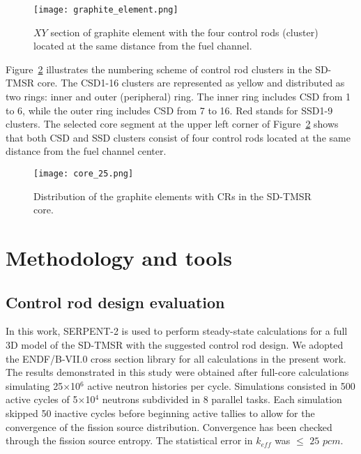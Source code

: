 \begin{figure}[t!]  %
	\centering
	\hspace{+0.65in}
	\texttt{[image: graphite\_element.png]}
	\caption{$XY$ section of graphite element with the four control rods 
	(cluster) located at the same distance from the fuel channel.}
	\label{fig:graphite_elemen}
\end{figure}

Figure~\ref{fig:core_25} illustrates the numbering scheme of control rod 
clusters in the SD-TMSR core.
The CSD1-16 clusters are represented as yellow and distributed as two rings: inner and outer (peripheral) ring. The inner ring includes CSD from 1 to 6, while the outer ring includes CSD from 7 to 16. Red stands for SSD1-9 clusters.
The selected core segment at the upper left corner of 
Figure~\ref{fig:core_25} shows that both CSD and SSD clusters consist of four 
control rods located at the same distance from the fuel channel center.
\begin{figure}[t!]  %
	\centering
	\hspace{+0.65in}
	\texttt{[image: core\_25.png]}
	\caption{Distribution of the graphite elements with CRs in the SD-TMSR core.}
	\label{fig:core_25}
\end{figure}

\section{Methodology and tools} \label{Methodology-and-tools}
\subsection{Control rod design evaluation}
In this work, SERPENT-2 \cite{leppanen2014serpent} is used to 
perform steady-state calculations for a full 3D model of the SD-TMSR with 
the suggested control rod design. We adopted the ENDF/B-VII.0 \cite{CHADWICK20062931} cross section library 
for all calculations in the present work. The results demonstrated in this study were obtained after full-core calculations simulating 25$\times$10$^6$ active neutron histories per cycle. Simulations consisted in 500 active cycles of 5$\times$10$^4$ neutrons subdivided in 8 parallel tasks. Each simulation skipped 50 inactive cycles before beginning active tallies to allow for the convergence of the fission source distribution. Convergence has been checked through the fission source entropy. The statistical error in $k_{eff}$ was $\leq$ $25$ $pcm$.

